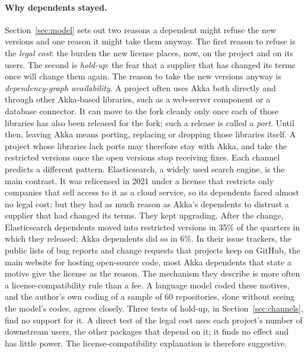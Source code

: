 \documentclass[11pt]{article}
\begin{document}
\paragraph{Why dependents stayed.} Section~\ref{sec:model} sets out two reasons a dependent might refuse the new versions and one reason it might take them anyway. The first reason to refuse is the \emph{legal cost}: the burden the new license places, now, on the project and on its users. The second is \emph{hold-up}: the fear that a supplier that has changed its terms once will change them again. The reason to take the new versions anyway is \emph{dependency-graph availability}. A project often uses Akka both directly and through other Akka-based libraries, such as a web-server component or a database connector. It can move to the fork cleanly only once each of those libraries has also been released for the fork; such a release is called a \emph{port}. Until then, leaving Akka means porting, replacing or dropping those libraries itself. A project whose libraries lack ports may therefore stay with Akka, and take the restricted versions once the open versions stop receiving fixes. Each channel predicts a different pattern. Elasticsearch, a widely used search engine, is the main contrast. It was relicensed in 2021 under a license that restricts only companies that sell access to it as a cloud service, so its dependents faced almost no legal cost; but they had as much reason as Akka's dependents to distrust a supplier that had changed its terms. They kept upgrading. After the change, Elasticsearch dependents moved into restricted versions in 35\% of the quarters in which they released; Akka dependents did so in 6\%. In their issue trackers, the public lists of bug reports and change requests that projects keep on GitHub, the main website for hosting open-source code, most Akka dependents that state a motive give the license as the reason. The mechanism they describe is more often a license-compatibility rule than a fee. A language model coded these motives, and the author's own coding of a sample of 60 repositories, done without seeing the model's codes, agrees closely. Three tests of hold-up, in Section~\ref{sec:channels}, find no support for it. A direct test of the legal cost uses each project's number of downstream users, the other packages that depend on it; it finds no effect and has little power. The license-compatibility explanation is therefore suggestive.
\end{document}
